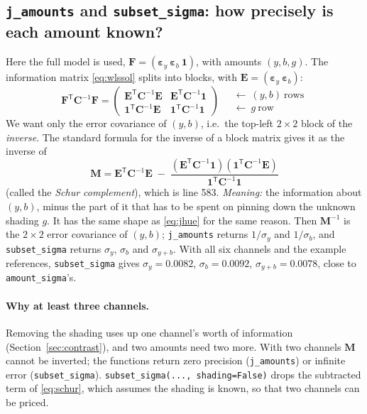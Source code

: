 \documentclass[11pt,letterpaper]{article}
\newcommand{\code}[1]{\texttt{#1}}
\newcommand{\vone}{\mathbf{1}}
\newcommand{\epsy}{\bm{\varepsilon}_y}
\newcommand{\epsb}{\bm{\varepsilon}_b}
\newcommand{\mE}{\mathbf{E}}
\newcommand{\mF}{\mathbf{F}}
\newcommand{\mM}{\mathbf{M}}
\newcommand{\mC}{\mathbf{C}}
\newcommand{\T}{^{\mathsf{T}}}
\newcommand{\inv}{^{-1}}
\newcommand{\src}[3]{%
  }
\begin{document}
\subsection{\code{j\_amounts} and \code{subset\_sigma}: how precisely is
each amount known?}

\src{575}{587}{The body of \code{j\_amounts}.}

Here the full model is used, $\mF = (\epsy\ \epsb\ \vone)$, with amounts
$(y, b, g)$.  The information matrix \eqref{eq:wlssol} splits into blocks,
with $\mE = (\epsy\ \epsb)$:
\[
\mF\T\mC\inv\mF =
\begin{pmatrix}
\mE\T\mC\inv\mE & \mE\T\mC\inv\vone\\
\vone\T\mC\inv\mE & \vone\T\mC\inv\vone
\end{pmatrix}
\quad
\begin{matrix} \leftarrow\ (y, b)\ \text{rows}\\ \leftarrow\ g\ \text{row}
\end{matrix}
\]
We want only the error covariance of $(y, b)$, i.e.\ the top-left
$2\times2$ block of the \emph{inverse}.  The standard formula for the inverse
of a block matrix gives it as the inverse of
\begin{equation}
\mM = \mE\T\mC\inv\mE \;-\;
\frac{(\mE\T\mC\inv\vone)(\vone\T\mC\inv\mE)}{\vone\T\mC\inv\vone}
\label{eq:schur}
\end{equation}
(called the \emph{Schur complement}), which is line 583.  \emph{Meaning:}
the information about $(y,b)$, minus the part of it that has to be spent on
pinning down the unknown shading $g$.  It has the same shape as
\eqref{eq:jhue} for the same reason.  Then $\mM\inv$ is the $2\times2$ error
covariance of $(y,b)$; \code{j\_amounts} returns $1/\sigma_y$ and
$1/\sigma_b$, and \code{subset\_sigma} returns $\sigma_y$, $\sigma_b$ and
$\sigma_{y+b}$.  With all six channels and the example references,
\code{subset\_sigma} gives $\sigma_y = 0.0082$, $\sigma_b = 0.0092$,
$\sigma_{y+b} = 0.0078$, close to \code{amount\_sigma}'s.

\paragraph{Why at least three channels.}  Removing the shading uses up one
channel's worth of information (Section~\ref{sec:contrast}), and two amounts
need two more.  With two channels $\mM$ cannot be inverted; the functions
return zero precision (\code{j\_amounts}) or infinite error
(\code{subset\_sigma}).  \code{subset\_sigma(..., shading=False)} drops the
subtracted term of \eqref{eq:schur}, which assumes the shading is known,
so that two channels can be priced.
\end{document}
